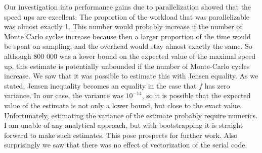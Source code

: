 \documentclass[11pt,english,a4paper]{article}
\begin{document}
Our investigation into performance gains due to parallelization showed that the speed ups are excellent. The proportion of the workload that was parallelizable was almost exactly 1. This number would probably increase if the number of Monte Carlo cycles increase because then a larger proportion of the time would be spent on sampling, and the overhead would stay almost exactly the same. So although 800 000 was a lower bound on the expected value of the maximal speed up, this estimate is potentially unbounded if the number of Monte-Carlo cycles increase. We saw that it was possible to estimate this with Jensen equality. As we stated, Jensen inequality becomes an equality in the case that $f$ has zero variance. In our case, the variance was $10^{-14}$, so it is possible that the expected value of the estimate is not only a lower bound, but close to the exact value. Unfortunately, estimating the variance of the estimate probably require numerics. I am unable of any analytical approach, but with bootstrapping it is straight forward to make such estimates. This pose prospects for further work. Also surprisingly we saw that there was no effect of vectorization of the serial code.\\
\\
\end{document}
